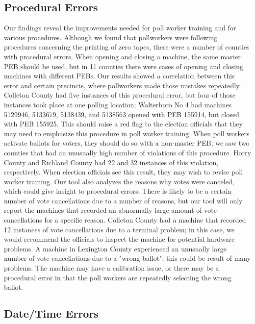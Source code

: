 \subsection{Procedural Errors}
Our findings reveal the improvements needed for poll worker training and for various procedures.  Although we found that pollworkers were following procedures concerning the printing of zero tapes, there were a number of counties with procedural errors.  When opening and closing a machine, the same master PEB should be used, but in 11 counties there were cases of opening and closing machines with different PEBs.  Our results showed a correlation between this error and certain precincts, where pollworkers made those mistakes repeatedly.  Colleton County had five instances of this procedural error, but four of those instances took place at one polling location; Walterboro No 4 had machines 5129946, 5133679, 5138439, and 5138563 opened with PEB 155914, but closed with PEB 155925.  This should raise a red flag to the election officials that they may need to emphasize this procedure in poll worker training.  When poll workers activate ballots for voters, they should do so with a non-master PEB; we saw two counties that had an unusually high number of violations of this procedure.  Horry County and Richland County had 22 and 32 instances of this violation, respectively.  When election officials see this result, they may wish to revise poll worker training.  Our tool also analyzes the reasons why votes were canceled, which could give insight to procedural errors.  There is likely to be a certain number of vote cancellations due to a number of reasons, but our tool will only report the machines that recorded an abnormally large amount of vote cancellations for a specific reason.  Colleton County had a machine that recorded 12 instances of vote cancellations due to a terminal problem; in this case, we would recommend the officials to inspect the machine for potential hardware problems.  A machine in Lexington County experienced an unusually large number of vote cancellations due to a "wrong ballot"; this could be result of many problems.  The machine may have a calibration issue, or there may be a procedural error in that the poll workers are repeatedly selecting the wrong ballot.

\subsection{Date/Time Errors}
